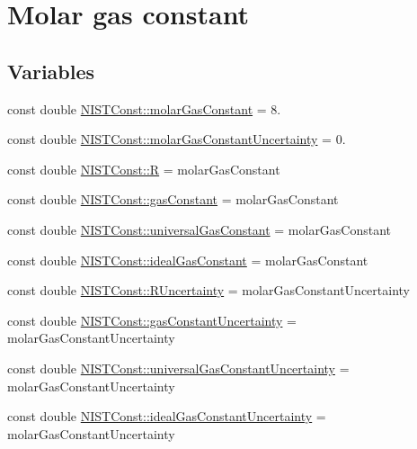 \hypertarget{group___n_i_s_t_const-_molar_gas_constant}{}\section{Molar gas constant}
\label{group___n_i_s_t_const-_molar_gas_constant}
\subsection*{Variables}
\begin{DoxyCompactItemize}
\item 
const double \hyperlink{group___n_i_s_t_const-_molar_gas_constant_ga923e5cda42e8fec4a70640b82051d309}{N\+I\+S\+T\+Const\+::molar\+Gas\+Constant} = 8.
\item 
const double \hyperlink{group___n_i_s_t_const-_molar_gas_constant_ga0b24ac606a3ba6a685599a78586fbc77}{N\+I\+S\+T\+Const\+::molar\+Gas\+Constant\+Uncertainty} = 0.
\item 
const double \hyperlink{group___n_i_s_t_const-_molar_gas_constant_gaa556f6ded49d1e2f9d5059fdd382bfd4}{N\+I\+S\+T\+Const\+::R} = molar\+Gas\+Constant
\item 
const double \hyperlink{group___n_i_s_t_const-_molar_gas_constant_ga8a80485a1bf8e9acded5ddd69a05084f}{N\+I\+S\+T\+Const\+::gas\+Constant} = molar\+Gas\+Constant
\item 
const double \hyperlink{group___n_i_s_t_const-_molar_gas_constant_ga081ff52b90c1476a7c7e55dcee67fa8e}{N\+I\+S\+T\+Const\+::universal\+Gas\+Constant} = molar\+Gas\+Constant
\item 
const double \hyperlink{group___n_i_s_t_const-_molar_gas_constant_ga0315ba6edc63c93914224443ef8a6e17}{N\+I\+S\+T\+Const\+::ideal\+Gas\+Constant} = molar\+Gas\+Constant
\item 
const double \hyperlink{group___n_i_s_t_const-_molar_gas_constant_ga02acf9948c7683e6252562c342b46778}{N\+I\+S\+T\+Const\+::\+R\+Uncertainty} = molar\+Gas\+Constant\+Uncertainty
\item 
const double \hyperlink{group___n_i_s_t_const-_molar_gas_constant_ga6edc72c9e9c859883be07279558df1de}{N\+I\+S\+T\+Const\+::gas\+Constant\+Uncertainty} = molar\+Gas\+Constant\+Uncertainty
\item 
const double \hyperlink{group___n_i_s_t_const-_molar_gas_constant_gac3e771060f5205aa59fd145c6447319c}{N\+I\+S\+T\+Const\+::universal\+Gas\+Constant\+Uncertainty} = molar\+Gas\+Constant\+Uncertainty
\item 
const double \hyperlink{group___n_i_s_t_const-_molar_gas_constant_ga479ccecafa4058b2d5e9ebc672a85ca4}{N\+I\+S\+T\+Const\+::ideal\+Gas\+Constant\+Uncertainty} = molar\+Gas\+Constant\+Uncertainty
\end{DoxyCompactItemize}


